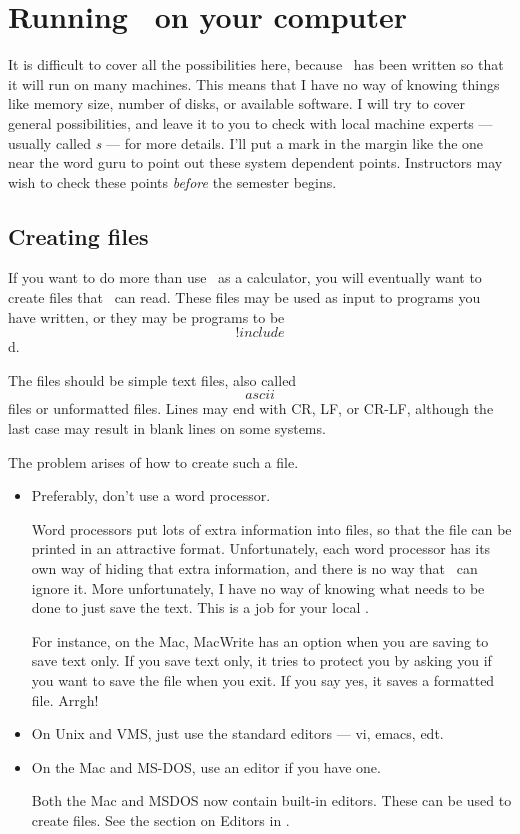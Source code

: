 \section{Running \ISETL\ on your computer}\label{extern}

It is difficult to cover all the possibilities here,
because \ISETL\ has been written so that it will run on many machines.
This means that I have no way of knowing things like memory size, number of
disks, or available software.
I will try to cover general possibilities, and leave it to you to check
with local machine experts
--- usually called {\em \GURU s} ---
for more details.
I'll put a mark in the margin like the one near the word guru to point out these
system dependent points.
Instructors may wish to check these points {\em before\/} the semester
begins.

\subsection{Creating files}\label{editor}
If you want to do more than use \ISETL\ as a calculator,
you will eventually want to create files that \ISETL\ can read.
These files may be used as input to programs you have written,
or they may be programs to be \[!include\]d.

The files should be simple text files,
also called \[ascii\] files or unformatted files.
Lines may end with CR, LF, or CR-LF, although the last case may result in
blank lines on some systems.

The problem arises of how to create such a file.
\begin{itemize}
    \item Preferably, don't use a word processor.

    Word processors put lots of extra information into files,
    so that the file can be printed in an attractive format.
    Unfortunately, each word processor has its own way of hiding that extra
    information, and there is no way that \ISETL\ can ignore it.
    More unfortunately, I have no way of knowing what needs to be done to just
    save the text.
    This is a job for your local \GURU.

    For instance, on the Mac, MacWrite has an option when you are saving
    to save text only.  If you save text only, it tries to protect you by
    asking you if you want to save the file when you exit.  If you say yes,
    it saves a formatted file.  Arrgh!

    \item On Unix and VMS, just use the standard editors --- vi, emacs, edt.
    \item On the Mac and MS-DOS, use an editor if you have one.

    Both the Mac and MSDOS now contain built-in editors.  These can be
    used to create files.  See the section on Editors in \Intro.

\end{itemize}


